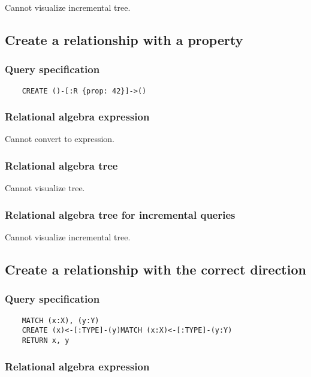 	Cannot visualize incremental tree.
	\subsection{Create a relationship with a property}

	\subsubsection*{Query specification}

	\begin{lstlisting}
	CREATE ()-[:R {prop: 42}]->()
	\end{lstlisting}


	\subsubsection*{Relational algebra expression}

	Cannot convert to expression.

	\subsubsection*{Relational algebra tree}

	Cannot visualize tree.

	\subsubsection*{Relational algebra tree for incremental queries}

	Cannot visualize incremental tree.
	\subsection{Create a relationship with the correct direction}

	\subsubsection*{Query specification}

	\begin{lstlisting}
	MATCH (x:X), (y:Y)
	CREATE (x)<-[:TYPE]-(y)MATCH (x:X)<-[:TYPE]-(y:Y)
	RETURN x, y
	\end{lstlisting}


	\subsubsection*{Relational algebra expression}


